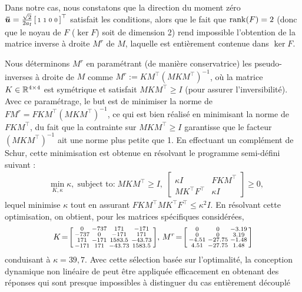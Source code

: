 Dans notre cas, nous constatons que la direction du moment zéro $\boldsymbol{\bar u} = \frac{\sqrt{2}}{2a_{\text{f}}}\left[ \begin{smallmatrix}1&1&0&0 \end{smallmatrix} \right]^\top$ satisfait les conditions, alors que le fait que $\operatorname{rank}(F) = 2$ (donc que le noyau de $F$ ($\ker F$) soit de dimension 2) rend impossible l'obtention de la matrice inverse à droite $M^r$ de $M$, laquelle est entièrement contenue dans $\ker F$.

Nous déterminons $M^r$ en paramétrant (de manière conservatrice) les  pseudo-inverses à droite de $M$ comme $M^r := KM^\top ( MKM^\top)^{-1}$, où la matrice $K \in {\mathbb R}^{4\times 4}$ est symétrique et satisfait $MKM^\top \geq I$ (pour assurer l'inversibilité). Avec ce paramétrage, le but est de minimiser la norme de $FM^r = F KM^\top ( MKM^\top)^{-1}$, ce qui est bien réalisé en minimisant la norme de $F KM^\top$, du fait que la contrainte sur $MKM^\top \geq I$ garantisse que le facteur $( MKM^\top)^{-1}$ ait une norme plus petite que 1.
En effectuant un complément de Schur, cette minimisation est obtenue en résolvant le programme semi-défini suivant :
\begin{align*}
&  \min_{K, \kappa} \kappa, \; \mbox{subject to:}
\;  M K M^\top\! \geq \!I, \; 
  \begin{bmatrix}
  \kappa I  &\! F K M^\top \\ 
   M K^\top F^\top &\! \kappa I
  \end{bmatrix}\! \geq\! 0,
\end{align*}
lequel minimise $\kappa$ tout en assurant $F K M^\top M K^\top F^\top \leq \kappa^2 I$.  En résolvant cette optimisation, on obtient, pour les matrices spécifiques considérées,
\begin{align*}
  K \!=\! \left[ \begin{smallmatrix}  0   &   -737   &    171   &   -171\\
      -737  &  0   &  -171  &     171\\
       171  &    -171    &   1583.5    &   -43.73\\
      -171  &     171    &   -43.73    &   1583.5 \end{smallmatrix} \right]\!, \,
  M^r \!=\! \left[ \begin{smallmatrix}0     &          0   &   -3.19\\
                 0      &         0   &    3.19\\
               -4.51    &  -27.75    &   -1.48\\
                4.51    &  -27.75    &    1.48 \end{smallmatrix} \right]
\end{align*}
conduisant à $\kappa = 39,7$. Avec cette sélection basée sur l'optimalité, la conception dynamique non linéaire de \cite{2020e-MicCenZacFra} peut être appliquée efficacement en obtenant des réponses qui sont presque impossibles à distinguer du cas entièrement découplé 
